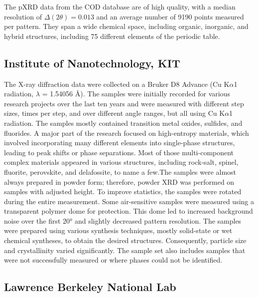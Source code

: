 The pXRD data from the COD database are of high quality, with a median resolution of $\Delta(2\theta) = 0.013${\textdegree} and an average number of 9190 points measured per pattern. They span a wide chemical space, including organic, inorganic, and hybrid structures, including 75 different elements of the periodic table.

\subsection*{Institute of Nanotechnology, KIT}

The X-ray diffraction data were collected on a Bruker D8 Advance (Cu K$\alpha$1 radiation, $\lambda$ = 1.54056 Å). The samples were initially recorded for various research projects over the last ten years and were measured with different step sizes, times per step, and over different angle ranges, but all using Cu K$\alpha$1 radiation. The samples mostly contained transition metal oxides, sulfides, and fluorides. A major part of the research focused on high-entropy materials, which involved incorporating many different elements into single-phase structures, leading to peak shifts or phase separations. Most of those multi-component complex materials appeared in various structures, including rock-salt, spinel, fluorite, perovskite, and delafossite, to name a few.The samples were almost always prepared in powder form; therefore, powder XRD was performed on samples with adjusted height. To improve statistics, the samples were rotated during the entire measurement. Some air-sensitive samples were measured using a transparent polymer dome for protection. This dome led to increased background noise over the first 20° and slightly decreased pattern resolution. The samples were prepared using various synthesis techniques, mostly solid-state or wet chemical syntheses, to obtain the desired structures. Consequently, particle size and crystallinity varied significantly. The sample set also includes samples that were not successfully measured or where phases could not be identified. 

\subsection*{Lawrence Berkeley National Lab}


